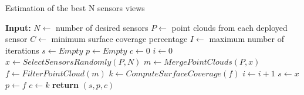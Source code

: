 \begin{algorithm}[H]
	\caption{Estimation of the best N sensors views}
	\label{alg:best-n-views}
	\begin{algorithmic}[1]
		\State \textbf{Input:}
		\State $N \gets$ number of desired sensors
		\State $P \gets$ point clouds from each deployed sensor
		\State $C \gets$ minimum surface coverage percentage
		\State $I \gets$ maximum number of iterations
			\State $s \gets Empty$
			\State $p \gets Empty$
			\State $c \gets 0$
			\State $i \gets 0$
				\State $x \gets SelectSensorsRandomly(P,N)$
				\State $m \gets MergePointClouds(P,x)$
				\State $f \gets FilterPointCloud(m)$
				\State $k \gets ComputeSurfaceCoverage(f)$
				\State $i \gets i + 1$
					\State $s \gets x$
					\State $p \gets f$
					\State $c \gets k$
				\EndIf
			\EndWhile
			\State \textbf{return} $(s,p,c)$
		\EndProcedure
	\end{algorithmic}
\end{algorithm}
